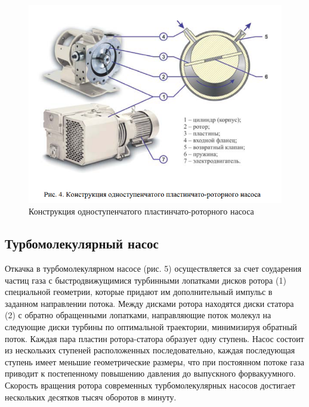 \documentclass[14pt, a4paper]{report}
\begin{document}
\begin{figure}[!ht]
\centering
\includegraphics[scale=0.5]{terma5_03.png}
\caption{Конструкция одноступенчатого пластинчато-роторного насоса}
\end{figure}

\subsection{Турбомолекулярный насос}

Откачка в турбомолекулярном насосе (рис. 5) осуществляется за счет соударения частиц газа с быстродвижущимися турбинными лопатками дисков ротора (1) специальной геометрии, которые придают им дополнительный импульс в заданном направлении потока. Между дисками ротора находятся диски статора (2) с обратно обращенными лопатками, направляющие поток молекул на следующие диски турбины по оптимальной траектории, минимизируя обратный поток. Каждая пара пластин ротора-статора образует одну ступень. Насос состоит из нескольких ступеней расположенных последовательно, каждая последующая ступень имеет меньшие геометрические размеры, что при постоянном потоке газа приводит к постепенному повышению давления до выпускного форвакуумного. Скорость вращения ротора современных турбомолекулярных насосов достигает нескольких десятков тысяч оборотов в минуту.
\end{document}
